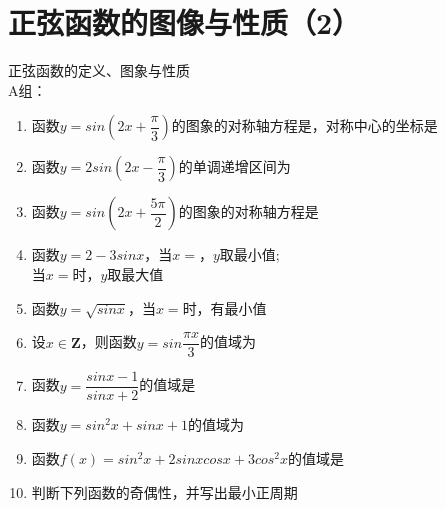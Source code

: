 \section{正弦函数的图像与性质（2）}
\zsd 正弦函数的定义、图象与性质 \\
A组：
\begin{enumerate}
    \item 函数$y = sin\left(2x+\dfrac{\pi}{3}\right)$的图象的对称轴方程是，对称中心的坐标是
    \item 函数$y = 2sin\left(2x-\dfrac{\pi}{3}\right)$的单调递增区间为
    \item 函数$y = sin\left(2x+\dfrac{5\pi}{2}\right)$的图象的对称轴方程是
    \item 函数$y = 2 - 3sinx$，当$x = $，$y$取最小值; \\
    当$x = $时，$y$取最大值
    \item 函数$y = \sqrt{sinx}$，当$x = $时，有最小值
    \item 设$x \in \mathbf{Z}$，则函数$y = sin\dfrac{\pi x}{3}$的值域为
    \item 函数$y = \dfrac{sinx - 1}{sinx + 2}$的值域是\blkda{$[-2, 0]$}
    \item 函数$y = sin^2x + sinx + 1$的值域为
    \item 函数$f(x) = sin^2x + 2sinx cosx + 3cos^2x$的值域是
    \item 判断下列函数的奇偶性，并写出最小正周期
\end{enumerate}
